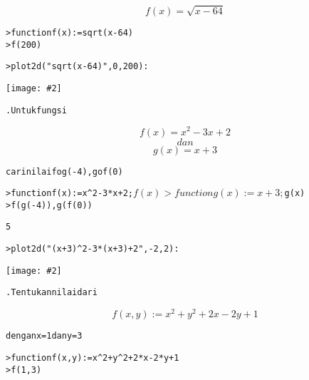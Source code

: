 \documentclass[a4paper,10pt]{article}
\newenvironment{eulernotebook}{}{}
\newenvironment{eulercomment}
{\color{green}\vspace{5pt}%
\parskip=0pt\parsep=0pt\topsep=0pt%
\goodbreak\begin{alltt}\ignorespaces}
{\end{alltt}\vspace{5pt}}
\newenvironment{eulerprompt}
{\color{red}\vspace{5pt plus 20pt}%
\begin{shaded}\parskip=0pt\parsep=0pt\topsep=0pt%
\begin{alltt}\ignorespaces}
{\end{alltt}\end{shaded}\vspace{5pt}}
\newenvironment{euleroutput}
{\color{black}\vspace{5pt}%
\parskip=0pt\parsep=0pt\topsep=0pt%
\begin{alltt}\ignorespaces}
{\end{alltt}\vspace{5pt}}
\newlength{\eulerline}
\newcommand\eulerimg[2]{%
\begin{center}\texttt{[image: \#2]}\end{center}}
\newenvironment{eulerformula}
{\color{green}\belowdisplayskip=0pt\belowdisplayshortskip=0pt%
\abovedisplayskip=0pt\abovedisplayshortskip=0pt}{}
\begin{document}
\begin{eulernotebook}
\begin{eulercomment}
\end{eulercomment}
\begin{eulerformula}
\[
f(x) = \sqrt{x-64}
\]
\end{eulerformula}
\begin{eulerprompt}
>function f(x) := sqrt(x-64)
>f(200)
\end{eulerprompt}
\begin{euleroutput}
  11.6619037897
\end{euleroutput}
\begin{eulerprompt}
>plot2d("sqrt(x-64)",0,200):
\end{eulerprompt}
\eulerimg{17}{images/Ardan Andhirta_22305141045_EMT4Kalkulus-1-005.png}
\begin{eulercomment}
5. Untuk fungsi
\end{eulercomment}
\begin{eulerformula}
\[
f(x) = x^2-3x+2
\]
\end{eulerformula}
\begin{eulerformula}
\[
dan
\]
\end{eulerformula}
\begin{eulerformula}
\[
g(x) = x+3
\]
\end{eulerformula}
\begin{eulercomment}
cari nilai fog(-4), gof(0)
\end{eulercomment}
\begin{eulerprompt}
>function f(x) := x^2-3*x+2; $f(x)
>function g(x) := x+3; $g(x)
>f(g(-4)), g(f(0))
\end{eulerprompt}
\begin{euleroutput}
  6
  5
\end{euleroutput}
\begin{eulerprompt}
>plot2d("(x+3)^2-3*(x+3)+2",-2,2):
\end{eulerprompt}
\eulerimg{17}{images/Ardan Andhirta_22305141045_EMT4Kalkulus-1-006.png}
\begin{eulercomment}
6. Tentukan nilai dari
\end{eulercomment}
\begin{eulerformula}
\[
f(x,y):=x^2+y^2+2x-2y+1
\]
\end{eulerformula}
\begin{eulercomment}
dengan x=1 dan y=3
\end{eulercomment}
\begin{eulerprompt}
>function f(x,y):= x^2+y^2+2*x-2*y+1
>f(1,3)
\end{eulerprompt}
\begin{euleroutput}

\end{euleroutput}
\end{eulernotebook}
\end{document}
